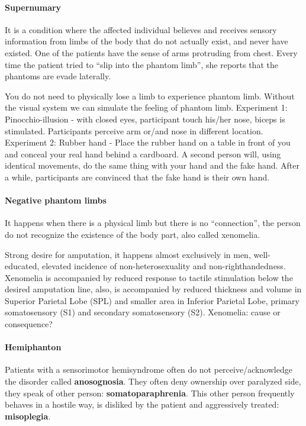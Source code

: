 \documentclass[12pt,article,oneside,a4paper]{memoir}
\begin{document}
\paragraph{Supernumary}
It is a condition where the affected individual believes and receives sensory
information from limbs of the body that do not actually exist, and never have
existed. One of the patients have the sense of arms protruding from chest.
Every time the patient tried to ``slip into the phantom limb'', she reports
that the phantoms are evade laterally.

You do not need to physically lose a limb to experience phantom limb. Without
the visual system we can simulate the feeling of phantom limb.
Experiment 1: Pinocchio-illusion - with closed eyes, participant touch his/her
nose, biceps is stimulated. Participants perceive arm or/and nose in different
location.
Experiment 2: Rubber hand - Place the rubber hand on a table in front of you
and conceal your real hand behind a cardboard. A second person will, using
identical movements, do the same thing with your hand and the fake hand. After 
a while, participants are convinced that the fake hand is their own hand.

\paragraph{Negative phantom limbs}
It happens when there is a physical limb but there is no ``connection'', the
person do not recognize the existence of the body part, also called xenomelia.

Strong desire for amputation, it happens almost exclusively in men, well-educated,
elevated incidence of non-heterosexuality and non-righthandedness. Xenomelia is
accompanied by reduced response to tactile stimulation below the desired
amputation line, also, is accompanied by reduced thickness and volume in Superior
Parietal Lobe (SPL) and smaller area in Inferior Parietal Lobe, primary
somatosensory (S1) and secondary somatosensory (S2).
Xenomelia: cause or consequence?

\paragraph{Hemiphanton}
Patients with a sensorimotor hemisyndrome often do not perceive/acknowledge
the disorder called \textbf{anosognosia}. They often deny ownership over
paralyzed side, they speak of other person: \textbf{somatoparaphrenia}. This
other person frequently behaves in a hostile way, is disliked by the patient and
aggressively treated: \textbf{misoplegia}.
\end{document}
